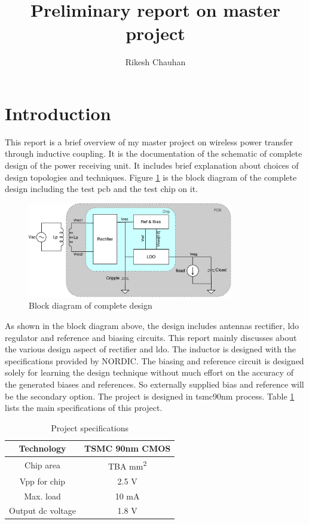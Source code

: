 \documentclass[12pt,a4paper,UKenglish]{article}
\title{Preliminary report on master project}
\author{Rikesh Chauhan}
\date{}
\begin{document}
\maketitle

\section{Introduction}
This report is a brief overview of my master project on wireless power transfer through inductive coupling. It is the documentation of the schematic of complete design of the power receiving unit. It includes brief explanation about choices of design topologies and techniques. Figure \ref{fig:blockd} is the block diagram of the complete design including the test \acrshort{pcb} and the test chip on it.

\begin{figure}[htbp] %
   \centering
   \includegraphics[width=0.8\textwidth]{img/block_diagram.pdf} 
   \caption{Block diagram of complete design}
   \label{fig:blockd}
\end{figure}

As shown in the block diagram above, the design includes antennas rectifier, \acrshort{ldo} regulator and reference and biasing circuits. This report mainly discusses about the various design aspect of rectifier and \acrshort{ldo}. The inductor is designed with the specifications provided by NORDIC. The biasing and reference circuit is designed solely for learning the design technique without much effort on the accuracy of the generated biases and references. So externally supplied bias and reference will be the secondary option. The project is designed in tsmc90nm process. Table \ref{proj_spec} lists the main specifications of this project.  \\ 

\begin{table}[!htbp]
\caption{Project specifications}
\begin{center}
\begin{tabular}{c|c}
\hline \hline
Technology & TSMC 90nm CMOS \\ \hline
Chip area & TBA mm\textsuperscript{2} \\ \hline
Vpp for chip & 2.5 V \\ \hline
Max. load & 10 mA \\ \hline
Output dc voltage & 1.8 V \\ 
\hline \hline
\end{tabular}
\end{center}
\label{proj_spec}
\end{table}
\end{document}
